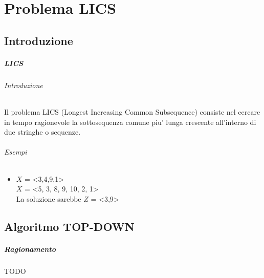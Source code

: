 \chapter{Problema LICS}

\section{Introduzione}

\paragraph{LICS}

\subparagraph{Introduzione}

Il problema LICS (Longest Increasing Common Subsequence) consiste nel cercare in tempo ragionevole la sottosequenza comune piu' lunga crescente all'interno di due stringhe o sequenze.

\subparagraph{Esempi}

\begin{itemize}

\item

$X$ = <3,4,9,1> \\
$X$ = <5, 3, 8, 9, 10, 2, 1> \\

La soluzione sarebbe $Z$ = <3,9>

\end{itemize}

\section{Algoritmo TOP-DOWN}

\paragraph{Ragionamento}

TODO